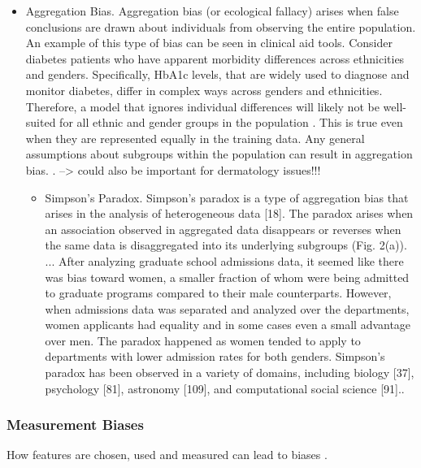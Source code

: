 \documentclass[12pt, a4paper, oneside]{book}   	%
\renewcommand{\paragraph}[1]{%
	\subsubsection*{#1}%
}
\newif\ifrawcitationactive
\newcommand{\rawcitationend}{
	\color{black}\rawcitationactivefalse
}
\newcommand{\rawcitationusedend}{%
	\ifrawcitationactive
	\color{purple}  %
	\else
	\color{black}  %
	\fi
}
\begin{document}
\begin{itemize}
					\item Aggregation Bias. Aggregation bias (or ecological fallacy) arises when false conclusions are drawn about individuals from observing the entire population. An example of this type of bias can be seen in clinical aid tools. Consider diabetes patients who have apparent morbidity differences across ethnicities and genders. Specifically, HbA1c levels, that are widely used to diagnose and monitor diabetes, differ in complex ways across genders and ethnicities. Therefore, a model that ignores individual differences will likely not be well-suited for all ethnic and gender groups in the population \autocite{M144_Suresh_2021}. This is true even when they are represented equally in the training data. Any general assumptions about subgroups within the population can result in aggregation bias. \autocite{Mehrabi_2021}. --> could also be important for dermatology issues!!!
					\begin{itemize}
						\item Simpson’s Paradox. Simpson’s paradox is a type of aggregation bias that arises in the analysis of heterogeneous data [18]. The paradox arises when an association observed in aggregated data disappears or reverses when the same data is disaggregated into its underlying subgroups (Fig. 2(a)). ... After analyzing graduate school admissions data, it seemed like there was bias toward women, a smaller fraction of whom were being admitted to graduate programs compared to their male counterparts. However, when admissions data was separated and analyzed over the departments, women applicants had equality and in some cases even a small advantage over men. The paradox happened as women tended to apply to departments with lower admission rates for both genders. Simpson’s paradox has been observed in a variety of domains, including biology [37], psychology [81], astronomy [109], and computational social science [91].\autocite{Mehrabi_2021}.
					\end{itemize}
				\end{itemize}
				\rawcitationusedend
				\rawcitationend
			
			\paragraph{Measurement Biases}
			How features are chosen, used and measured can lead to biases \autocites{Mehrabi_2021}{M144_Suresh_2021}.
			
\end{document}
